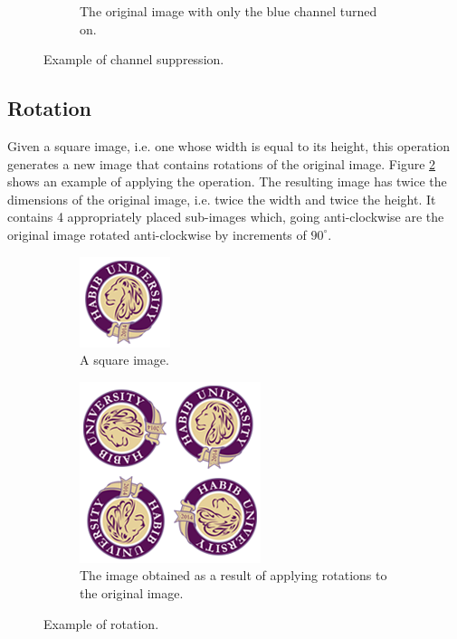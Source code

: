 \documentclass[addpoints]{exam}
\begin{document}
\begin{figure}
\begin{subfigure}{.3\textwidth}
      \caption{The original image with only the blue channel turned on.}
    \end{subfigure}
    \caption{Example of channel suppression.}
    \label{fig:channel}
  \end{figure}

  \subsection{Rotation}

  Given a square image, i.e. one whose width is equal to its height, this operation generates a new image that contains rotations of the original image. Figure \ref{fig:rotate} shows an example of applying the operation. The resulting image has twice the dimensions of the original image, i.e. twice the width and twice the height. It contains 4 appropriately placed sub-images which, going anti-clockwise are the original image rotated anti-clockwise by increments of  $90^\circ$.

  \begin{figure}
    \centering
    \begin{subfigure}{.2\textwidth}
      \includegraphics[scale=.5]{hu-logo}
      \caption{A square image.}
    \end{subfigure}
    \begin{subfigure}[c]{.35\textwidth}
      \includegraphics[scale=.5]{hu-logo-rotated}
      \caption{The image obtained as a result of applying rotations to the original image.}
    \end{subfigure}
    \caption{Example of rotation.}
    \label{fig:rotate}
  \end{figure}
\end{document}
